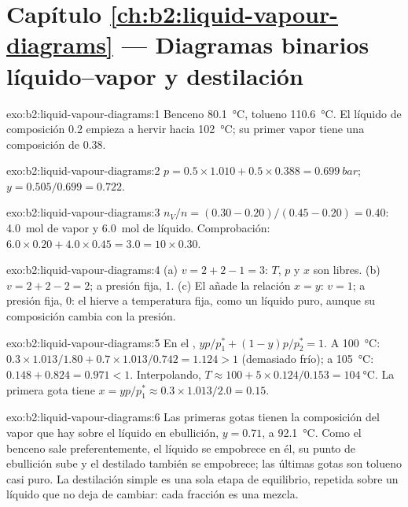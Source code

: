 \section*{Capítulo \ref{ch:b2:liquid-vapour-diagrams} --- Diagramas binarios líquido--vapor y destilación}

\begin{solution}{exo:b2:liquid-vapour-diagrams:1}
Benceno \qty{80.1}{\degreeCelsius}, tolueno \qty{110.6}{\degreeCelsius}. El líquido
de composición 0.2 empieza a hervir hacia \qty{102}{\degreeCelsius}; su primer
vapor tiene una composición de 0.38.
\end{solution}

\begin{solution}{exo:b2:liquid-vapour-diagrams:2}
$p = 0.5 \times 1.010 + 0.5 \times 0.388 = \qty{0.699}{bar}$;
$y = 0.505/0.699 = 0.722$.
\end{solution}

\begin{solution}{exo:b2:liquid-vapour-diagrams:3}
$n_V/n = (0.30 - 0.20)/(0.45 - 0.20) = 0.40$: \qty{4.0}{mol} de vapor y
\qty{6.0}{mol} de líquido. Comprobación: $6.0 \times 0.20 + 4.0 \times 0.45 = 3.0 = 10
\times 0.30$.
\end{solution}

\begin{solution}{exo:b2:liquid-vapour-diagrams:4}
(a) $v = 2 + 2 - 1 = 3$: $T$, $p$ y $x$ son libres. (b) $v = 2 + 2 - 2 = 2$; a
presión fija, 1. (c) El  añade la relación $x = y$: $v = 1$; a presión
fija, 0: el  hierve a temperatura fija, como un líquido puro,
aunque su composición cambia con la presión.
\end{solution}

\begin{solution}{exo:b2:liquid-vapour-diagrams:5}
En el , $yp/p_1^* + (1 - y)p/p_2^* = 1$. A \qty{100}{\degreeCelsius}:
$0.3 \times 1.013/1.80 + 0.7 \times 1.013/0.742 = 1.124 > 1$ (demasiado frío); a
\qty{105}{\degreeCelsius}: $0.148 + 0.824 = 0.971 < 1$. Interpolando, $T \approx
100 + 5 \times 0.124/0.153 = \qty{104}{\degreeCelsius}$. La primera gota tiene $x =
yp/p_1^* \approx 0.3 \times 1.013/2.0 = 0.15$.
\end{solution}

\begin{solution}{exo:b2:liquid-vapour-diagrams:6}
Las primeras gotas tienen la composición del vapor que hay sobre el líquido en ebullición,
$y = 0.71$, a \qty{92.1}{\degreeCelsius}. Como el benceno sale preferentemente, el
líquido se empobrece en él, su punto de ebullición sube y el destilado también se
empobrece; las últimas gotas son tolueno casi puro. La destilación simple es una
sola etapa de equilibrio, repetida sobre un líquido que no deja de cambiar: cada
fracción es una mezcla.
\end{solution}

